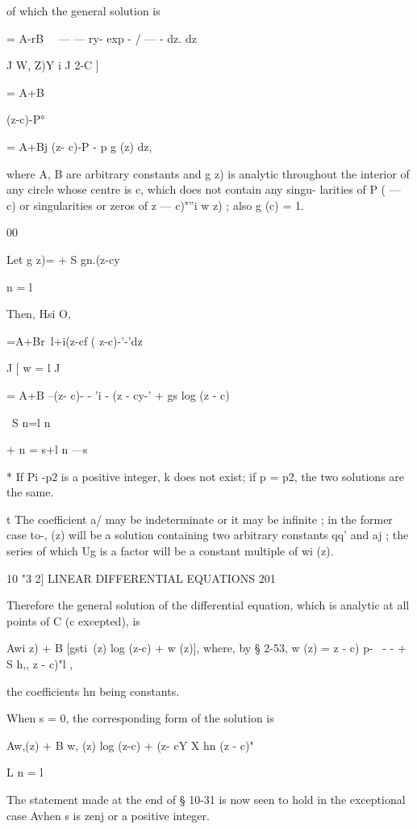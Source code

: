 of which the general solution is 

 = A-rB\ ~ — — ry- exp - / —   - dz. dz 

J  W, Z)Y   i J 2-C ] 



= A+B 



(z-c)-P° 



= A+Bj (z- c)-P - p g (z) dz, 



where A, B are arbitrary constants and g  z) is analytic throughout the 
interior of any circle whose centre is c, which does not contain any singu- 
larities of P (  — c) or singularities or zeros of  z — c)"''i w   z) ; also g (c) = 1. 

00 

Let g z)= +  S gn.(z-cy\ 

n = l 

Then, Hsi O, 

 =A+Br\ l+i(z-cf ( z-c)-'-'dz 

J [ w = l J 

= A+B --(z- c)-  - 'i -  (z - cy-' + gs log (z - c) 

\  S n=l   n 

+ %
n = s+l n —s 

* If Pi -p2 is a positive integer, k does not exist; if p  = p2, the two solutions are the same. 

t The coefficient a/ may be indeterminate or it may be infinite ; in the former case to-, (z) 
will be a solution containing two arbitrary constants qq' and aj ; the series of which Ug is a 
factor will be a constant multiple of wi (z). 



10 "3 2] LINEAR DIFFERENTIAL EQUATIONS 201 

Therefore the general solution of the differential equation, which is 
analytic at all points of C (c excepted), is 

Awi  z) + B [gsti\ (z) log (z-c) + w (z)], 
where, by § 2-53, w (z) =  z - c) p- \ - - + S h,,  z - c)"l , 

the coefficients hn being constants. 

When s = 0, the corresponding form of the solution is 

Aw,(z) + B w, (z) log (z-c) + (z- cY  X hn (z - c)" 

L n = l \  

The statement made at the end of § 10-31 is now seen to hold in the 
exceptional case Avhen s is zenj or a positive integer. 

